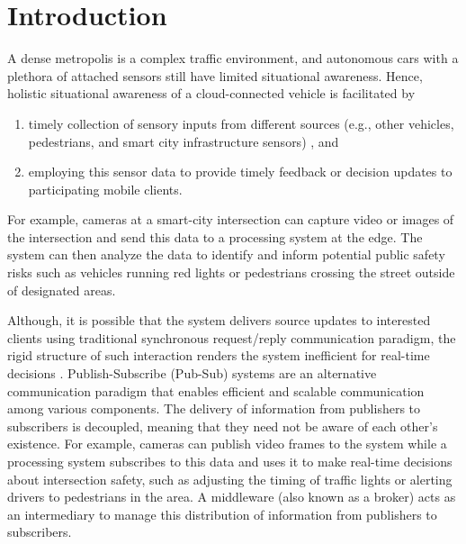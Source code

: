 \documentclass[conference, 10pt]{IEEEtran}
\begin{document}
\section{Introduction}
A dense metropolis is a complex traffic environment, and autonomous cars with a plethora of attached sensors still have limited situational awareness. Hence, holistic situational awareness of a cloud-connected vehicle is facilitated by
\begin{enumerate}
    \item timely collection of  sensory inputs from different sources (e.g., other vehicles, pedestrians, and smart city infrastructure sensors)
    , and
    \item employing this sensor data 
    to provide timely feedback or decision updates to participating mobile clients. 
\end{enumerate}
For example, cameras at a smart-city intersection \cite{Cosmos} can capture video or images of the intersection and send this data to a processing system at the edge. The system can then analyze the data to identify and inform potential public safety risks such as vehicles running red lights or pedestrians crossing the street outside of designated areas.

Although, it is possible that the system delivers source updates to interested clients using traditional synchronous request/reply communication paradigm, the rigid structure of such interaction renders the system inefficient for real-time decisions \cite{Carzaniga-pubsub}.
Publish-Subscribe (Pub-Sub) systems are an 
alternative communication paradigm 
that enables efficient and scalable communication among various components. The delivery of information from publishers to subscribers is decoupled, meaning that they need not  be aware of each other's existence.
For example, cameras can publish video frames to the system while a processing system subscribes to this data and uses it to make real-time decisions about intersection safety, such as adjusting the timing of traffic lights or alerting drivers to pedestrians in the area.
A middleware (also known as a broker) acts as an intermediary 
to manage this distribution of information from publishers to subscribers.
\end{document}
